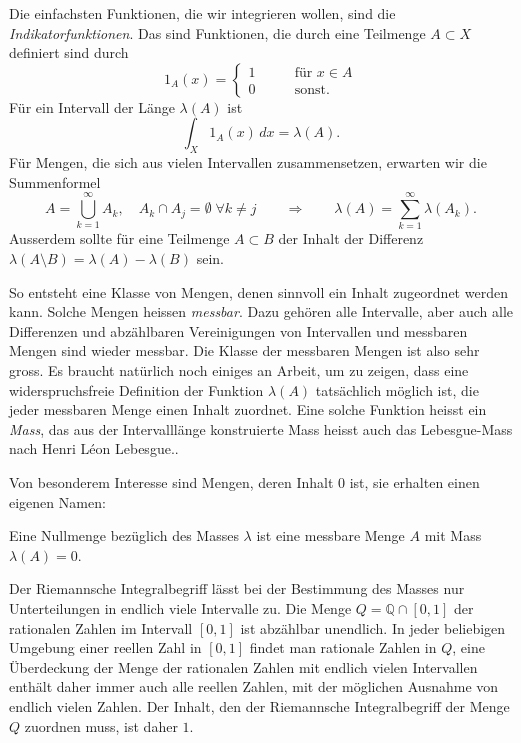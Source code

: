 Die einfachsten Funktionen, die wir integrieren wollen, sind die
{\em Indikatorfunktionen}.
Das sind Funktionen, die durch eine Teilmenge
$A\subset X$ definiert sind durch
\[
1_A(x)
=
\begin{cases}
1&\qquad\text{für $x\in A$}\\
0&\qquad\text{sonst}.
\end{cases}
\]
Für ein Intervall der Länge $\lambda(A)$ ist
\[
\int_X 1_A(x)\,dx = \lambda(A).
\]
Für Mengen, die sich aus vielen Intervallen zusammensetzen, erwarten wir
die Summenformel
\[
A=\bigcup_{k=1}^\infty A_k,
\quad
A_k\cap A_j = \emptyset\;\forall k\ne j
\qquad\Rightarrow\qquad
\lambda(A) = \sum_{k=1}^\infty \lambda(A_k).
\]
Ausserdem sollte für eine Teilmenge $A\subset B$ der Inhalt der
Differenz $\lambda(A\setminus B)=\lambda(A)-\lambda(B)$ sein.

So entsteht eine Klasse von Mengen, denen sinnvoll ein Inhalt 
zugeordnet werden kann.
Solche Mengen heissen {\em messbar}.
%
%
Dazu gehören alle Intervalle, aber auch alle Differenzen und
abzählbaren Vereinigungen von Intervallen und messbaren Mengen
sind wieder messbar.
Die Klasse der messbaren Mengen ist also sehr gross.
Es braucht natürlich noch einiges an Arbeit, um zu zeigen, dass
eine widerspruchsfreie Definition der Funktion $\lambda(A)$
tatsächlich möglich ist, die jeder messbaren Menge einen
Inhalt zuordnet.
Eine solche Funktion heisst ein {\em Mass}, das aus der Intervalllänge
konstruierte Mass heisst auch das Lebesgue-Mass nach Henri Léon Lebesgue..
%
%
%

Von besonderem Interesse sind Mengen, deren Inhalt $0$ ist,
sie erhalten einen eigenen Namen:

\begin{definition}[Nullmenge]
\label{buch:skalarprodukt:funktionenraeume:definition:nullmenge}
Eine Nullmenge bezüglich des Masses $\lambda$ ist eine messbare
Menge $A$ mit Mass $\lambda(A)=0$.
%
\end{definition}

Der Riemannsche Integralbegriff lässt bei der Bestimmung des Masses
nur Unterteilungen in endlich viele Intervalle zu. 
Die Menge $Q=\mathbb{Q}\cap [0,1]$ der rationalen Zahlen im Intervall
$[0,1]$ ist abzählbar unendlich.
In jeder beliebigen Umgebung einer reellen Zahl in $[0,1]$ findet man
rationale Zahlen in $Q$, eine Überdeckung der Menge der rationalen
Zahlen mit endlich vielen Intervallen enthält daher immer auch alle
reellen Zahlen, mit der möglichen Ausnahme von endlich vielen Zahlen.
Der Inhalt, den der Riemannsche Integralbegriff der Menge $Q$ zuordnen
muss, ist daher $1$.

